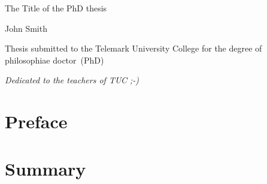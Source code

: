 \documentclass[11pt,openright]{book} %
\begin{document}
\frontmatter  %
\begin{titlepage}
  \begin{center}
    \Huge{The Title of the PhD thesis}
  \end{center}
  \begin{center}
    \Large{John Smith}
  \end{center}
  \begin{center}
    \large{Thesis submitted to the Telemark University College for the degree of philosophiae doctor~(PhD)}
  \end{center}
\end{titlepage}\cleardoublepage

\begin{flushright}
\large{\emph{Dedicated to the teachers of TUC ;-)}}

\end{flushright}



\chapter*{Preface}
\label{sec:preface}
\lipsum[1-3]

\chapter*{Summary}
\label{sec:summary}
\lipsum[1-3]

\tableofcontents

\listoffigures %

\listoftables  %
\end{document}
